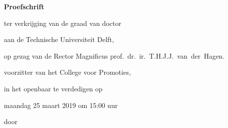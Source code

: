 \begin{titlepage}

\begin{center}

\vspace*{2\bigskipamount}

{\makeatletter
\titlestyle\bfseries\LARGE\@title
\makeatother}

{\makeatletter
\ifx\@subtitle\undefined\else
    \bigskip
    \titlefont\titleshape\Large\@subtitle
\fi
\makeatother}

\end{center}

\cleardoublepage
\thispagestyle{empty}

\begin{center}


\vspace*{2\bigskipamount}

{\makeatletter
\titlestyle\bfseries\LARGE\@title
\makeatother}

{\makeatletter
\ifx\@subtitle\undefined\else
    \bigskip
    \titlefont\titleshape\Large\@subtitle
\fi
\makeatother}

\vfill


{\Large\titlefont\bfseries Proefschrift}

\bigskip
\bigskip

ter verkrijging van de graad van doctor

aan de Technische Universiteit Delft,

op gezag van de Rector Magnificus prof.~dr.~ir.~T.H.J.J.~van~der~Hagen.  %

voorzitter van het College voor Promoties,

in het openbaar te verdedigen op

 maandag 25 maart 2019 om 15:00 uur  %

\bigskip
\bigskip

door

\bigskip
\bigskip


\end{center}
\end{titlepage}
